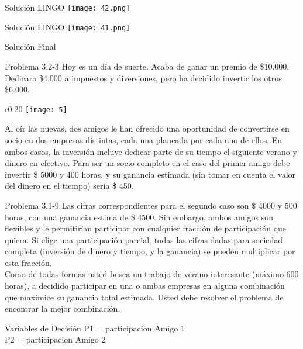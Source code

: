 \documentclass{beamer}
\begin{document}
\begin{frame}[fragile]{Solución LINGO}
    \texttt{[image: 42.png]}
\end{frame}
\begin{frame}[fragile]{Solución LINGO}
    \texttt{[image: 41.png]}
\end{frame}

\begin{frame}[fragile]{Solución Final}
\end{frame}

\begin{frame}[t,fragile]{Problema 3.2-3}
Hoy es un día de suerte. Acaba de ganar un premio de \$10.000. Dedicara \$4.000 a impuestos y diversiones, pero ha decidido invertir los otros \$6.000. \begin{wrapfigure}{r}{0.20\textwidth}
    \centering
    \texttt{[image: 5]}
\end{wrapfigure}Al oír las nuevas, dos amigos le han ofrecido una oportunidad de convertirse en socio en dos empresas distintas, cada una planeada por cada uno de ellos. En ambos casos, la inversión incluye dedicar parte de su tiempo el siguiente verano y dinero en efectivo. Para ser un socio completo en el caso del primer amigo debe invertir \$ 5000 y 400 horas, y su ganancia estimada (sin tomar en cuenta el valor del dinero en el tiempo) seria \$ 450. 

\end{frame}
\begin{frame}[t,fragile]{Problema  3.1-9}
Las cifras correspondientes para el segundo caso son \$ 4000 y 500 horas, con una ganancia estima de \$ 4500. Sin embargo, ambos amigos son flexibles y le permitirían participar con cualquier fracción de participación que quiera. Si elige una participación parcial, todas las cifras dadas para sociedad completa (inversión de dinero y tiempo, y la ganancia) se pueden multiplicar por esta fracción. \\
Como de todas formas usted busca un trabajo de verano interesante (máximo 600 horas), a decidido participar en una o ambas empresas en alguna combinación que maximice su ganancia total estimada. Usted debe resolver el problema de encontrar la mejor combinación.
\end{frame}

\begin{frame}[fragile]{Variables de Decisión}
P1 = participacion Amigo 1\\
P2 = participacion Amigo 2

\end{frame}
\end{document}
